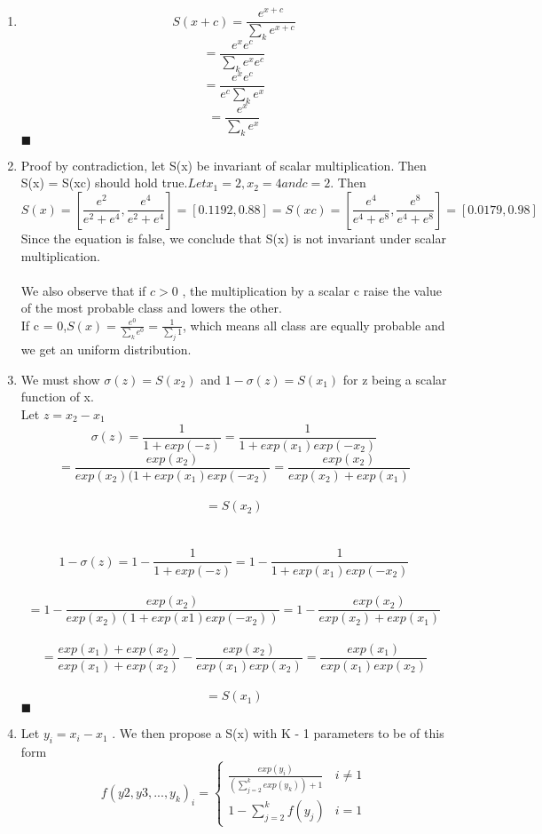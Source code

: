 \documentclass{article}
\begin{document}
\begin{enumerate}
     \item 
	$$ S(x+c) = \frac{e^{x+c}}{\sum_k e^{x + c}}$$ $$ = \frac{e^x e^c}{\sum_k e^{x} e^{c}}$$ $$= \frac{e^x e^c}{e^{c}\sum_k e^{x}}$$ $$ =  \frac{e^x}{\sum_k e^{x}}$$
	$\blacksquare$

    \item 
	Proof by contradiction, let S(x) be invariant of scalar multiplication. Then S(x) = S(xc) should hold true.$ Let x_1 = 2 , x_2 = 4 and c = 2$. Then 
	$$ S(x) = [\frac{e^2}{e^2 + e^4}, \frac{e^4}{e^2 + e^4}]  = [0.1192,0.88] = S(xc) =  [\frac{e^4}{e^4 + e^8}, \frac{e^8}{e^4 + e^8}] = [0.0179,0.98]$$
	Since the equation is false, we conclude that S(x) is not invariant under scalar multiplication.\\ \\
	We also observe that if $c > 0$ , the multiplication by a scalar c raise the value of the most probable class and lowers the other.\\
	If c = 0,$ S(x) = \frac{e^0}{\sum_k e^0} = \frac{1}{\sum_j 1}$, which means all class are equally probable and we get an uniform distribution.\\

    \item
	We must show $\sigma(z) = S(x_2)$ and $1 - \sigma(z) = S(x_1)$ for z being a scalar function of x.\\

	Let $z = x_2 - x_1$\\
	$$\sigma(z) = \frac{1}{1 + exp(-z)} = \frac{1}{1 + exp(x_1)exp(-x_2)}$$ $$ = \frac{exp(x_2)}{exp(x_2)( 1 + exp(x_1)exp(-x_2)} = \frac{exp(x_2)}{exp(x_2) + exp(x_1)} $$ \\		$$= S(x_2)$$\\ \\

	$$1 - \sigma(z) = 1 - \frac{1}{1 + exp(-z)} = 1 - \frac{1}{1 + exp(x_1)exp(-x_2)}$$\\
	$$ = 1 - \frac{exp(x_2)}{exp(x_2)(1 + exp(x1)exp(-x_2))}  = 1 - \frac{exp(x_2)}{exp(x_2) + exp(x_1)}$$\\
	$$ = \frac{exp(x_1) + exp(x_2)}{exp(x_1) + exp(x_2)} - \frac{exp(x_2)}{exp(x_1)exp(x_2)} = \frac{exp(x_1)}{exp(x_1)exp(x_2)}$$\\
	$$ = S(x_1)$$
	$\blacksquare$

    \item 
	Let $y_i = x_i - x_1$ . We then propose a S(x) with K - 1 parameters to be of this form
	\[ 
	 f(y2,y3,...,y_k)_i = 
	\begin{cases} 
      \frac{exp(y_i)}{(\sum^k_{j=2} exp(y_k)) + 1} & i  \neq 1 \\
      1 - \sum^k_{j=2} f(y_j) & i=1
   \end{cases}
\]


\end{enumerate}
\end{document}
